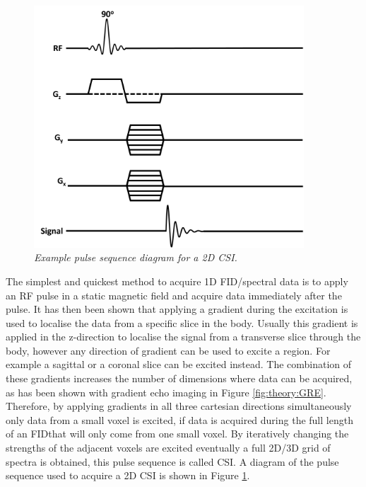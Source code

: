 \begin{figure}[h]
    \centering
    \includegraphics[width=0.9\textwidth]{Figures/Theory/CSI_sequence.png}
    \caption{\textit{Example pulse sequence diagram for a 2D \ac{CSI}.}}
    \label{fig:theory:CSI}
\end{figure}


The simplest and quickest method to acquire 1D \ac{FID}/spectral data is to apply an \ac{RF} pulse in a static magnetic field and acquire data immediately after the pulse. It has then been shown that applying a gradient during the excitation is used to localise the data from a specific slice in the body. Usually this gradient is applied in the z-direction to localise the signal from a transverse slice through the body, however any direction of gradient can be used to excite a region. For example a sagittal or a coronal slice can be excited instead. The combination of these gradients increases the number of dimensions where data can be acquired, as has been shown with gradient echo imaging in Figure \ref{fig:theory:GRE}. Therefore, by applying gradients in all three cartesian directions simultaneously only data from a small voxel is excited, if data is acquired during the full length of an \ac{FID}that will only come from one small voxel. By iteratively changing the strengths of the adjacent voxels are excited eventually a full 2D/3D grid of spectra is obtained, this pulse sequence is called \ac{CSI}. A diagram of the pulse sequence used to acquire a 2D \ac{CSI} is shown in Figure \ref{fig:theory:CSI}.

